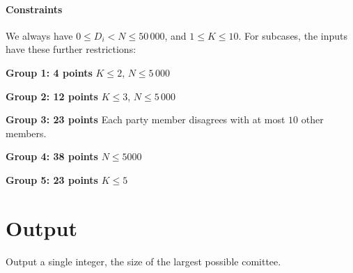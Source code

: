 \paragraph*{Constraints}
We always have $0 \leq D_i < N \leq 50\,000$, and $1 \leq K \leq 10$. For subcases, the inputs have these further restrictions:

\begin{description}
    \item{\textbf{Group 1: 4 points}} $K \leq 2$, $N \leq 5\,000$ %
    \item{\textbf{Group 2: 12 points}} $K \leq 3$, $N \leq 5\,000$ %
    \item{\textbf{Group 3: 23 points}} Each party member disagrees with at most $10$ other members.
    \item{\textbf{Group 4: 38 points}} $N \leq 5000$
    \item{\textbf{Group 5: 23 points}} $K \leq 5$
\end{description}


\section*{Output}
Output a single integer, the size of the largest possible comittee.
